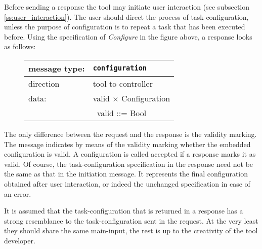 \documentclass{article}
\newcommand{\msg}[1]{\texttt{#1}}
\begin{document}
   Before sending a response the tool may initiate user interaction (see
   subsection \ref{ss:user_interaction}). The user should direct the process of
   task-configuration, unless the purpose of configuration is to repeat a task
   that has been executed before. Using the specification of \textit{Configure}
   in the figure above, a response looks as follows:

   \begin{figure}[H]
    \begin{center}
     \begin{tabular}{|ll|}
      \hline
       message type:   & \msg{configuration} \\
      \hline
       direction       & tool to controller \\
       data:           & valid $\times$ Configuration \\
                       & \ valid ::= Bool \\
      \hline
     \end{tabular}
    \end{center}
   \end{figure}
   \vspace{-0.4cm}

   \noindent The only difference between the request and the response is
   the validity marking. The message indicates by means of the validity marking
   whether the embedded configuration is valid. A configuration is called
   accepted if a response marks it as valid. Of course, the task-configuration
   specification in the response need not be the same as that in the initiation
   message. It represents the final configuration obtained after user
   interaction, or indeed the unchanged specification in case of an error.

   It is assumed that the task-configuration that is returned in a response has
   a strong resemblance to the task-configuration sent in the request. At the
   very least they should share the same main-input, the rest is up to the
   creativity of the tool developer.

  \pagebreak
\end{document}
